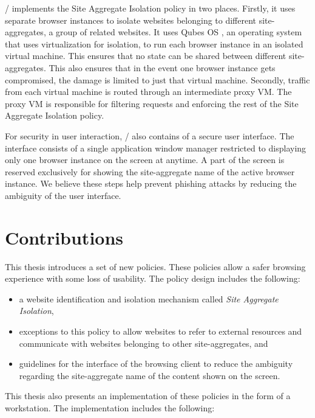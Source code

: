 \namesecureworkstation/ implements the Site Aggregate Isolation policy in two places. Firstly, it uses separate browser instances to isolate websites belonging to different site-aggregates, a group of related websites. It uses Qubes OS \cite{qubes-os}, an operating system that uses virtualization for isolation, to run each browser instance in an isolated virtual machine. This ensures that no state can be shared between different site-aggregates. This also ensures that in the event one browser instance gets compromised, the damage is limited to just that virtual machine.
Secondly, traffic from each virtual machine is routed through an intermediate proxy VM. The proxy VM is responsible for filtering requests and enforcing the rest of the Site Aggregate Isolation policy.

For security in user interaction, \namesecureworkstation/ also contains of a secure user interface. The interface consists of a single application window manager restricted to displaying only one browser instance on the screen at anytime. A part of the screen is reserved exclusively for showing the site-aggregate name of the active browser instance. We believe these steps help prevent phishing attacks by reducing the ambiguity of the user interface.

\section{Contributions}

This thesis introduces a set of new policies. These policies allow a safer browsing experience with some loss of usability. The policy design includes the following:

\begin{itemize}
    \item a website identification and isolation mechanism called \textit{Site Aggregate Isolation},
    \item exceptions to this policy to allow websites to refer to external resources and communicate with websites belonging to other site-aggregates, and
    \item guidelines for the interface of the browsing client to reduce the ambiguity regarding the site-aggregate name of the content shown on the screen.
\end{itemize}

This thesis also presents an implementation of these policies in the form of a workstation. The implementation includes the following:

